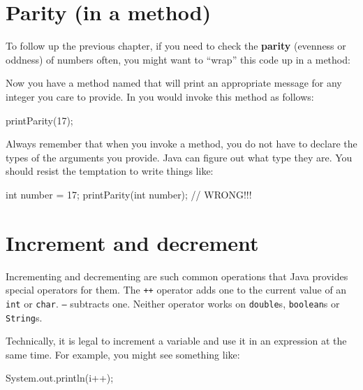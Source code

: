 \section{Parity (in a method)}
\label{alternative}


To follow up the previous chapter, if you need to check the {\bf parity} (evenness or oddness) of numbers often, you might want to ``wrap'' this code up in a method:


Now you have a method named  that will print an appropriate message for any integer you care to provide.
In  you would invoke this method as follows:

\begin{code}
printParity(17);
\end{code}

Always remember that when you invoke a method, you do not have to declare the types of the arguments you provide.
Java can figure out what type they are.
You should resist the temptation to write things like:

\begin{code}
int number = 17;
printParity(int number);        // WRONG!!!
\end{code}


\section{Increment and decrement}


Incrementing and decrementing are such common operations that Java provides special operators for them.
The {\tt ++} operator adds one to the current value of an {\tt int} or {\tt char}.
{\tt --} subtracts one.
Neither operator works on {\tt double}s, {\tt boolean}s or {\tt String}s.

Technically, it is legal to increment a variable and use it in an expression at the same time.
For example, you might see something like:

\begin{code}
System.out.println(i++);
\end{code}

